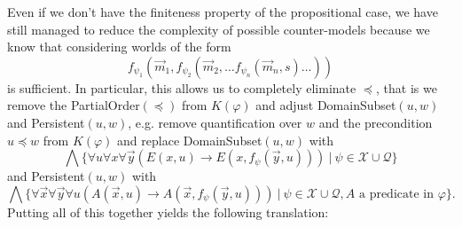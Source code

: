 \documentclass{easychair}
\theoremstyle{definition}
\theoremstyle{definition}
\theoremstyle{definition}
\theoremstyle{definition}
\theoremstyle{definition}
\theoremstyle{definition}
\theoremstyle{definition}
\begin{document}
Even if we don't have the finiteness property of the propositional case, we have still managed to reduce the complexity of possible counter-models because we know that considering worlds of the form $$f_{\psi_1}(\vec m_1, f_{\psi_2}(\vec m_2, \dots f_{\psi_n}(\vec m_n, s)\dots))$$ is sufficient.
In particular, this allows us to completely eliminate $\preceq$, that is we remove the PartialOrder$(\preceq)$
from $K(\varphi)$ and adjust DomainSubset$(u, w)$ and Persistent$(u, w)$, e.g. remove quantification over $w$ and the precondition $u\preceq w$ from $K(\varphi)$ and replace DomainSubset$(u, w)$ with
$$
	\bigwedge\{\forall u\forall x\forall\vec y(E(x, u)\to E(x, f_\psi(\vec y, u)))\:|\:\psi\in\mathcal X\cup\mathcal Q\}
$$
and Persistent$(u, w)$ with
$$
	\bigwedge\{\forall\vec x\forall\vec y\forall u(A(\vec x, u)\to A(\vec x, f_\psi(\vec y, u)))\:|\:\psi\in\mathcal X\cup\mathcal Q, \text{$A$ a predicate in $\varphi$}\}.
$$Putting all of this together yields the following translation:
\end{document}

